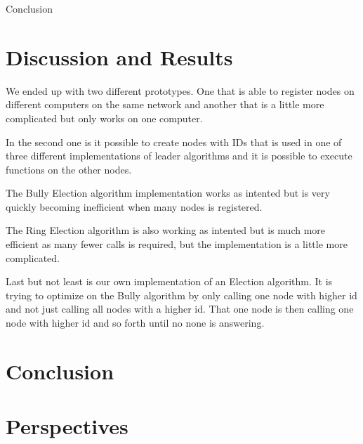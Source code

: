 {Conclusion}
\section{Discussion and Results}
We ended up with two different prototypes. One that is able to register nodes on different computers on the same network and another that is a little more complicated but only works on one computer.

In the second one is it possible to create nodes with IDs that is used in one of three different implementations of leader algorithms and it is possible to execute functions on the other nodes.

The Bully Election algorithm implementation works as intented but is very quickly becoming inefficient when many nodes is registered.

The Ring Election algorithm is also working as intented but is much more efficient as many fewer calls is required, but the implementation is a little more complicated.

Last but not least is our own implementation of an Election algorithm. It is trying to optimize on the Bully algorithm by only calling one node with higher id and not just calling all nodes with a higher id. That one node is then calling one node with higher id and so forth until no none is answering.

\section{Conclusion}

\section{Perspectives}
